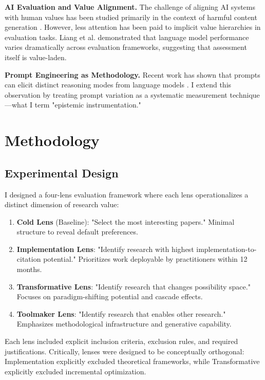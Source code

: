 \documentclass{article}
\begin{document}
\textbf{AI Evaluation and Value Alignment.} The challenge of aligning AI systems with human values has been studied primarily in the context of harmful content generation \cite{bommasani2021opportunities}. However, less attention has been paid to implicit value hierarchies in evaluation tasks. Liang et al. \cite{liang2023holistic} demonstrated that language model performance varies dramatically across evaluation frameworks, suggesting that assessment itself is value-laden.

\textbf{Prompt Engineering as Methodology.} Recent work has shown that prompts can elicit distinct reasoning modes from language models \cite{perez2023discovering}. I extend this observation by treating prompt variation as a systematic measurement technique—what I term "epistemic instrumentation."

\section{Methodology}

\subsection{Experimental Design}

I designed a four-lens evaluation framework where each lens operationalizes a distinct dimension of research value:

\begin{enumerate}
    \item \textbf{Cold Lens} (Baseline): "Select the most interesting papers." Minimal structure to reveal default preferences.
    \item \textbf{Implementation Lens}: "Identify research with highest implementation-to-citation potential." Prioritizes work deployable by practitioners within 12 months.
    \item \textbf{Transformative Lens}: "Identify research that changes possibility space." Focuses on paradigm-shifting potential and cascade effects.
    \item \textbf{Toolmaker Lens}: "Identify research that enables other research." Emphasizes methodological infrastructure and generative capability.
\end{enumerate}

Each lens included explicit inclusion criteria, exclusion rules, and required justifications. Critically, lenses were designed to be conceptually orthogonal: Implementation explicitly excluded theoretical frameworks, while Transformative explicitly excluded incremental optimization.
\end{document}
